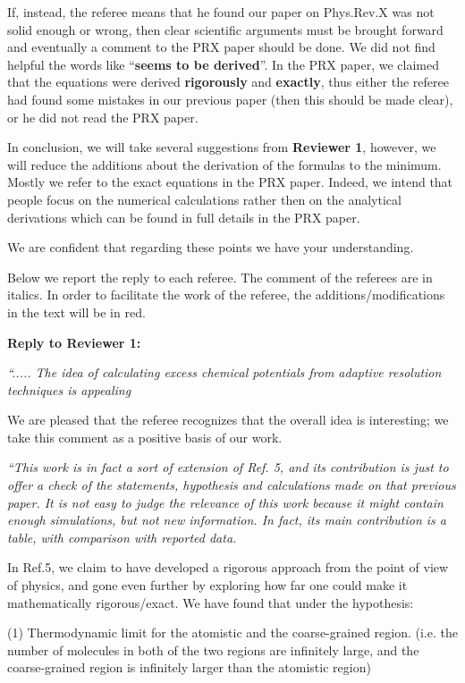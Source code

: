 \documentclass[12pt]{article}
\newcommand{\redc}[1]{{\color{red} #1}}
\newcommand{\recheck}[1]{{\color{red} #1}}
\begin{document}
If, instead, the referee means that he found our paper on Phys.Rev.X
was not solid enough or wrong, then clear scientific arguments must be
brought forward and eventually a comment to the PRX paper should be
done. We did not find helpful the \recheck{words like ``{\bf seems to
    be derived}''}. In the PRX paper, we claimed that the equations
were \recheck{derived \textbf{rigorously} and {\bf exactly}},
\recheck{thus either the referee had found some mistakes in our
  previous paper (then this should be made clear), or he did not read
  the PRX paper.}

In conclusion, we will take several suggestions from {\bf Reviewer 1},
\recheck{however, we will reduce the additions about the
derivation of the formulas to the minimum. Mostly we refer to the exact
equations in the PRX paper}. \recheck{Indeed, we intend} that people focus on
the numerical calculations rather then on the analytical derivations
which can be found in full details in the PRX paper.

We are confident that regarding these points we have your understanding.

\vskip 2cm

Below we report the reply to each referee. The comment of the referees
are in italics.  In order to facilitate the work of the referee, the
additions/modifications in the text will be in red.


{\bf Reply to Reviewer 1:}

{\it ``..... The idea of calculating excess
  chemical potentials from adaptive resolution techniques is appealing}

We are pleased that the referee recognizes that the overall idea is interesting; we take this comment as a positive basis of our work.

{\it ``This work is in fact a sort of extension of Ref. 5, and its contribution is just to offer a check of the
statements, hypothesis and calculations made on that previous paper. It is not easy to judge the relevance of this
work because it might contain enough simulations, but not new information. In fact, its main contribution is a table, with comparison with reported data.}

In Ref.5, we claim to have developed a rigorous approach from the
point of view of physics, and gone even further by exploring how far
one could make it mathematically rigorous/exact. We have found that
under the hypothesis:

(1) Thermodynamic limit for the \redc{atomistic and the coarse-grained
  region. (i.e. the number of molecules in both of the two regions are
  infinitely large, and the coarse-grained region is infinitely larger
  than the atomistic region)}
\end{document}
